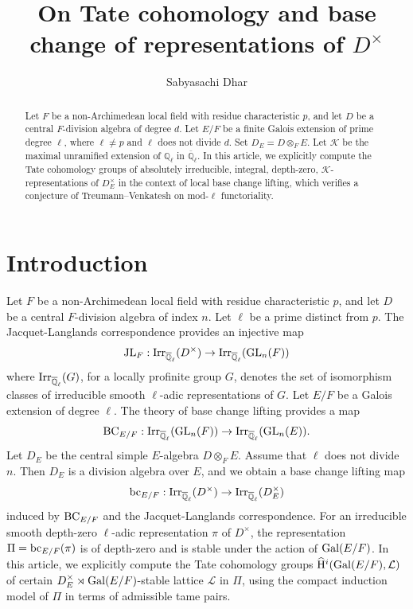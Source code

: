 \documentclass[10pt, reqno]{amsart}
\title{On Tate cohomology and base change of representations of $D^\times$}
\author{Sabyasachi Dhar}
\theoremstyle{plain}
\numberwithin{equation}{section}
\begin{document}
	\maketitle
\begin{abstract}
Let $F$ be a non-Archimedean local field with residue characteristic $p$, and let $D$ be a central $F$-division algebra of degree $d$. Let $E/F$ be a finite Galois extension of prime degree $\ell$, where $\ell \ne p$ and $\ell$ does not divide $d$. Set $D_E=D\otimes_F E$. Let $\mathcal{K}$ be the maximal unramified extension of $\mathbb{Q}_\ell$ in $\overline{\mathbb{Q}}_\ell$. In this article, we explicitly compute the Tate cohomology groups of absolutely irreducible, integral, depth-zero, $\mathcal{K}$-representations of $D_E^\times$ in the context of local base change lifting, which verifies a conjecture of Treumann--Venkatesh on mod-$\ell$ functoriality.  
\end{abstract}
\section{Introduction}
Let $F$ be a non-Archimedean local field with residue characteristic $p$, and let $D$ be a central $F$-division algebra of index $n$. Let $\ell$ be a prime distinct from $p$.
The Jacquet-Langlands correspondence provides an injective map
$$ {\rm JL}_F : {\rm Irr}_{\overline{\mathbb{Q}}_\ell}(D^\times)\rightarrow {\rm Irr}_{\overline{\mathbb{Q}}_\ell}({\rm GL}_n(F)) $$
where ${\rm Irr}_{\overline{\mathbb{Q}}_\ell}(G)$, for a locally profinite group $G$, denotes the set of isomorphism classes of irreducible smooth $\ell$-adic representations of $G$. Let $E/F$ be a Galois extension of degree $\ell$. The theory of base change lifting provides a map
$$ {\rm BC}_{E/F} : {\rm Irr}_{\overline{\mathbb{Q}}_\ell}({\rm GL}_n(F))\rightarrow {\rm Irr}_{\overline{\mathbb{Q}}_\ell}({\rm GL}_n(E)). $$
Let $D_E$ be the central simple $E$-algebra $D\otimes_F E$. Assume that $\ell$ does not divide $n$. Then $D_E$ is a division algebra over $E$, and we obtain a base change lifting map
$$ {\rm bc}_{E/F}:{\rm Irr}_{\overline{\mathbb{Q}}_\ell}(D^\times)\rightarrow {\rm Irr}_{\overline{\mathbb{Q}}_\ell}(D_E^\times)$$
induced by ${\rm BC}_{E/F}$ and the Jacquet-Langlands correspondence. For an irreducible smooth depth-zero $\ell$-adic representation $\pi$ of $D^\times$, the representation $\Pi={\rm bc}_{E/F}(\pi)$ is of depth-zero and is stable under the action of ${\rm Gal}(E/F)$. In this article, we explicitly compute the Tate cohomology groups $\widehat{\rm H}^i({\rm Gal}(E/F),\mathcal{L})$ of certain $D_E^\times\rtimes {\rm Gal}(E/F)$-stable lattice $\mathcal{L}$ in $\Pi$, using the compact induction model of $\Pi$ in terms of admissible tame pairs.
\end{document}
